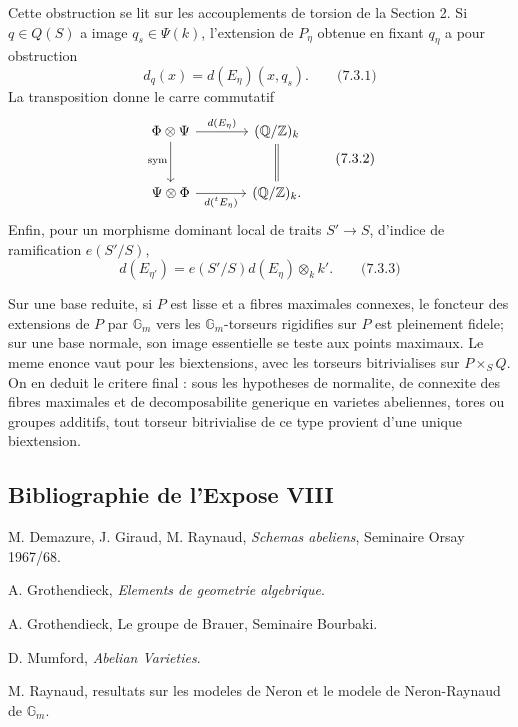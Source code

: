 \documentclass[11pt]{article}
\providecommand{\Z}{\mathbb Z}
\providecommand{\Q}{\mathbb Q}
\providecommand{\Gm}{\mathbb G_m}
\providecommand{\Gm}{\mathbb G_m}
\providecommand{\Z}{\mathbb Z}
\providecommand{\Q}{\mathbb Q}
\begin{document}
Cette obstruction se lit sur les accouplements de torsion de la Section 2.  Si \(q\in Q(S)\) a image \(q_s\in\Psi(k)\), l'extension de \(P_\eta\) obtenue en fixant \(q_\eta\) a pour obstruction
\[
        d_q(x)=d(E_\eta)(x,q_s).
\qquad\text{(7.3.1)}
\]
La transposition donne le carre commutatif
\[
\begin{tikzcd}[column sep=large,row sep=large]
 \Phi\otimes\Psi \arrow[r,"d(E_\eta)"]\arrow[d,"\mathrm{sym}"'] & (\Q/\Z)_k\arrow[d,equal]\\
 \Psi\otimes\Phi \arrow[r,"d({}^tE_\eta)"'] & (\Q/\Z)_k .
\end{tikzcd}
\qquad\text{(7.3.2)}
\]
Enfin, pour un morphisme dominant local de traits \(S'\to S\), d'indice de ramification \(e(S'/S)\),
\[
        d(E_{\eta'})=e(S'/S)d(E_\eta)\otimes_k k'.
\qquad\text{(7.3.3)}
\]

Sur une base reduite, si \(P\) est lisse et a fibres maximales connexes, le foncteur des extensions de \(P\) par \(\Gm\) vers les \(\Gm\)-torseurs rigidifies sur \(P\) est pleinement fidele; sur une base normale, son image essentielle se teste aux points maximaux.  Le meme enonce vaut pour les biextensions, avec les torseurs bitrivialises sur \(P\times_S Q\).  On en deduit le critere final : sous les hypotheses de normalite, de connexite des fibres maximales et de decomposabilite generique en varietes abeliennes, tores ou groupes additifs, tout torseur bitrivialise de ce type provient d'une unique biextension.

\subsection*{Bibliographie de l'Expose VIII}
\begin{enumerate}[label={[\arabic*]}]
\item M. Demazure, J. Giraud, M. Raynaud, \emph{Schemas abeliens}, Seminaire Orsay 1967/68.
\item A. Grothendieck, \emph{Elements de geometrie algebrique}.
\item A. Grothendieck, Le groupe de Brauer, Seminaire Bourbaki.
\item D. Mumford, \emph{Abelian Varieties}.
\item M. Raynaud, resultats sur les modeles de Neron et le modele de Neron-Raynaud de \(\Gm\).
\end{enumerate}
\end{document}
